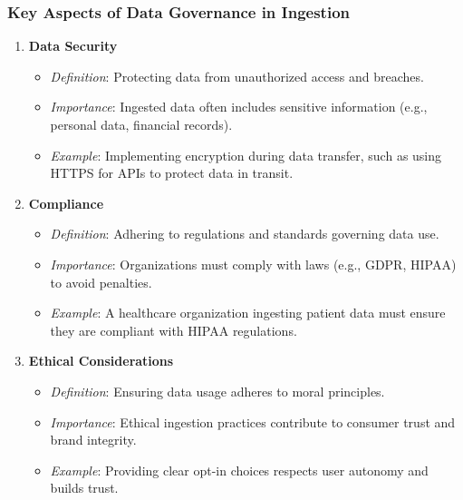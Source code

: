 \documentclass{beamer}
\begin{document}
\begin{frame}[fragile]
    \frametitle{Key Aspects of Data Governance in Ingestion}
    \begin{enumerate}
        \item \textbf{Data Security}
            \begin{itemize}
                \item \textit{Definition}: Protecting data from unauthorized access and breaches.
                \item \textit{Importance}: Ingested data often includes sensitive information (e.g., personal data, financial records).
                \item \textit{Example}: Implementing encryption during data transfer, such as using HTTPS for APIs to protect data in transit.
            \end{itemize}
        \item \textbf{Compliance}
            \begin{itemize}
                \item \textit{Definition}: Adhering to regulations and standards governing data use.
                \item \textit{Importance}: Organizations must comply with laws (e.g., GDPR, HIPAA) to avoid penalties.
                \item \textit{Example}: A healthcare organization ingesting patient data must ensure they are compliant with HIPAA regulations.
            \end{itemize}
        \item \textbf{Ethical Considerations}
            \begin{itemize}
                \item \textit{Definition}: Ensuring data usage adheres to moral principles.
                \item \textit{Importance}: Ethical ingestion practices contribute to consumer trust and brand integrity.
                \item \textit{Example}: Providing clear opt-in choices respects user autonomy and builds trust.
            \end{itemize}
    \end{enumerate}
\end{frame}
\end{document}

